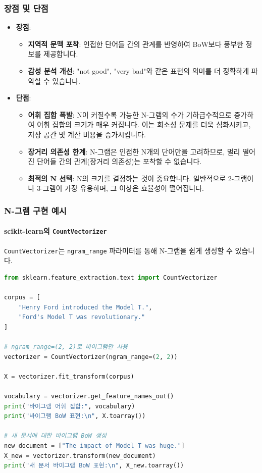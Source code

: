 \documentclass[11pt,a4paper]{article}
\theoremstyle{definition}
\begin{document}
\subsubsection{장점 및 단점}
\begin{itemize}
    \item \textbf{장점}:
        \begin{itemize}
            \item \textbf{지역적 문맥 포착}: 인접한 단어들 간의 관계를 반영하여 BoW보다 풍부한 정보를 제공합니다.
            \item \textbf{감성 분석 개선}: "not good", "very bad"와 같은 표현의 의미를 더 정확하게 파악할 수 있습니다.
        \end{itemize}
    \item \textbf{단점}:
        \begin{itemize}
            \item \textbf{어휘 집합 폭발}: N이 커질수록 가능한 N-그램의 수가 기하급수적으로 증가하여 어휘 집합의 크기가 매우 커집니다. 이는 희소성 문제를 더욱 심화시키고, 저장 공간 및 계산 비용을 증가시킵니다.
            \item \textbf{장거리 의존성 한계}: N-그램은 인접한 N개의 단어만을 고려하므로, 멀리 떨어진 단어들 간의 관계(장거리 의존성)는 포착할 수 없습니다.
            \item \textbf{최적의 N 선택}: N의 크기를 결정하는 것이 중요합니다. 일반적으로 2-그램이나 3-그램이 가장 유용하며, 그 이상은 효율성이 떨어집니다.
        \end{itemize}
\end{itemize}

\subsubsection{N-그램 구현 예시}

\paragraph{scikit-learn의 \texttt{CountVectorizer}}
\texttt{CountVectorizer}는 \texttt{ngram\_range} 파라미터를 통해 N-그램을 쉽게 생성할 수 있습니다.

\begin{lstlisting}[language=Python, caption={scikit-learn CountVectorizer를 이용한 N-그램 생성}, label=lst:sklearn_ngram]
from sklearn.feature_extraction.text import CountVectorizer

corpus = [
    "Henry Ford introduced the Model T.",
    "Ford's Model T was revolutionary."
]

# ngram_range=(2, 2)로 바이그램만 사용
vectorizer = CountVectorizer(ngram_range=(2, 2))

X = vectorizer.fit_transform(corpus)

vocabulary = vectorizer.get_feature_names_out()
print("바이그램 어휘 집합:", vocabulary)
print("바이그램 BoW 표현:\n", X.toarray())

# 새 문서에 대한 바이그램 BoW 생성
new_document = ["The impact of Model T was huge."]
X_new = vectorizer.transform(new_document)
print("새 문서 바이그램 BoW 표현:\n", X_new.toarray())
\end{lstlisting}
\end{document}
